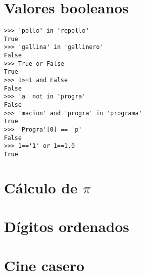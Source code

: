 \section*{Valores booleanos}
\begin{lstlisting}[style=consola]
>>> 'pollo' in 'repollo'
True
>>> 'gallina' in 'gallinero'
False
>>> True or False
True
>>> 1>=1 and False
False
>>> 'a' not in 'progra'
False
>>> 'macion' and 'progra' in 'programa'
True
>>> 'Progra'[0] == 'p'
False
>>> 1=='1' or 1==1.0
True
\end{lstlisting}

\section*{Cálculo de $\pi$}

\pagebreak[4]
\section*{Dígitos ordenados}



\section*{Cine casero}
